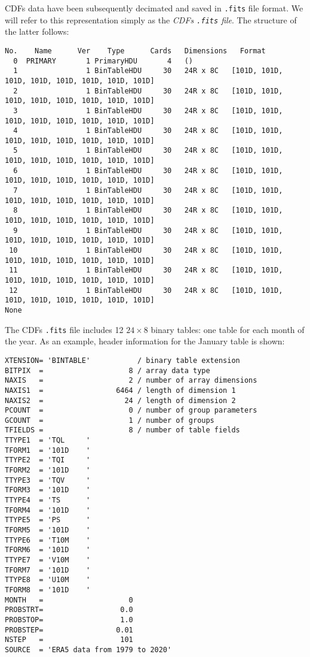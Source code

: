CDFs data have been subsequently decimated and saved in \texttt{.fits} file
format. We will refer to this representation simply as the \emph{CDFs
\texttt{.fits} file}. The structure of the latter
follows:

\begin{Verbatim}[fontsize=\scriptsize]
No.    Name      Ver    Type      Cards   Dimensions   Format
  0  PRIMARY       1 PrimaryHDU       4   ()
  1                1 BinTableHDU     30   24R x 8C   [101D, 101D, 101D, 101D, 101D, 101D, 101D, 101D]
  2                1 BinTableHDU     30   24R x 8C   [101D, 101D, 101D, 101D, 101D, 101D, 101D, 101D]
  3                1 BinTableHDU     30   24R x 8C   [101D, 101D, 101D, 101D, 101D, 101D, 101D, 101D]
  4                1 BinTableHDU     30   24R x 8C   [101D, 101D, 101D, 101D, 101D, 101D, 101D, 101D]
  5                1 BinTableHDU     30   24R x 8C   [101D, 101D, 101D, 101D, 101D, 101D, 101D, 101D]
  6                1 BinTableHDU     30   24R x 8C   [101D, 101D, 101D, 101D, 101D, 101D, 101D, 101D]
  7                1 BinTableHDU     30   24R x 8C   [101D, 101D, 101D, 101D, 101D, 101D, 101D, 101D]
  8                1 BinTableHDU     30   24R x 8C   [101D, 101D, 101D, 101D, 101D, 101D, 101D, 101D]
  9                1 BinTableHDU     30   24R x 8C   [101D, 101D, 101D, 101D, 101D, 101D, 101D, 101D]
 10                1 BinTableHDU     30   24R x 8C   [101D, 101D, 101D, 101D, 101D, 101D, 101D, 101D]
 11                1 BinTableHDU     30   24R x 8C   [101D, 101D, 101D, 101D, 101D, 101D, 101D, 101D]
 12                1 BinTableHDU     30   24R x 8C   [101D, 101D, 101D, 101D, 101D, 101D, 101D, 101D]
None
\end{Verbatim}

The CDFs \texttt{.fits} file includes \num{12} $24 \times 8$ binary tables:
one table for each month of the year. As an example, header information for
the January table is shown:

\begin{Verbatim}
XTENSION= 'BINTABLE'           / binary table extension
BITPIX  =                    8 / array data type
NAXIS   =                    2 / number of array dimensions
NAXIS1  =                 6464 / length of dimension 1
NAXIS2  =                   24 / length of dimension 2
PCOUNT  =                    0 / number of group parameters
GCOUNT  =                    1 / number of groups
TFIELDS =                    8 / number of table fields
TTYPE1  = 'TQL     '
TFORM1  = '101D    '
TTYPE2  = 'TQI     '
TFORM2  = '101D    '
TTYPE3  = 'TQV     '
TFORM3  = '101D    '
TTYPE4  = 'TS      '
TFORM4  = '101D    '
TTYPE5  = 'PS      '
TFORM5  = '101D    '
TTYPE6  = 'T10M    '
TFORM6  = '101D    '
TTYPE7  = 'V10M    '
TFORM7  = '101D    '
TTYPE8  = 'U10M    '
TFORM8  = '101D    '
MONTH   =                    0
PROBSTRT=                  0.0
PROBSTOP=                  1.0
PROBSTEP=                 0.01
NSTEP   =                  101
SOURCE  = 'ERA5 data from 1979 to 2020'
\end{Verbatim}

